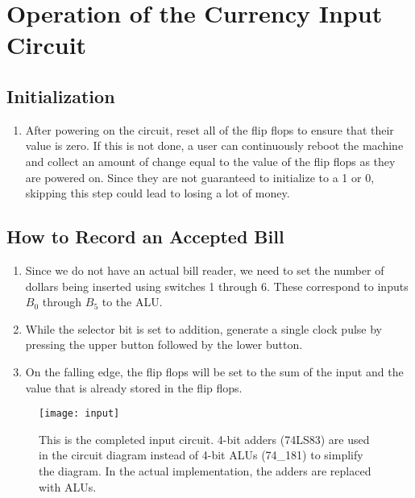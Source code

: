 \section{Operation of the Currency Input Circuit}

\subsection{Initialization}
\begin{enumerate}
\item After powering on the circuit, reset all of the flip flops to ensure that their value is zero. If this is not done, a user can continuously reboot the machine and collect an amount of change equal to the value of the flip flops as they are powered on. Since they are not guaranteed to initialize to a 1 or 0, skipping this step could lead to losing a lot of money. 
\end{enumerate}

\subsection{How to Record an Accepted Bill}
\begin{enumerate}
\item Since we do not have an actual bill reader, we need to set the number of dollars being inserted using switches 1 through 6. These correspond to inputs $B_0$ through $B_5$ to the ALU.
\item While the selector bit is set to addition, generate a single clock pulse by pressing the upper button followed by the lower button.
\item On the falling edge, the flip flops will be set to the sum of the input and the value that is already stored in the flip flops. 
\end{enumerate}

\begin{figure}[H]
\centering
\texttt{[image: input]} \\
\caption{This is the completed input circuit. 4-bit adders (74LS83) are used in the circuit diagram instead of 4-bit ALUs (74\_181) to simplify the diagram. In the actual implementation, the adders are replaced with ALUs.}
\label{input-circuit}
\end{figure}
